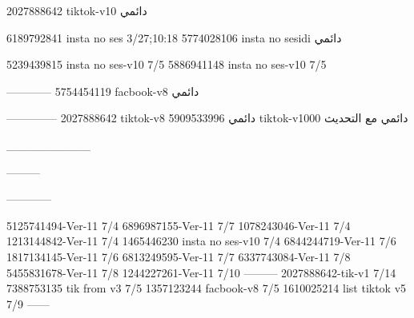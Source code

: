 2027888642 tiktok-v10
دائمي

6189792841 insta no ses
3/27;10:18
5774028106 insta no sesidi
دائمي

5239439815 insta no ses-v10
7/5
5886941148 insta no ses-v10
7/5

------------
5754454119 facbook-v8
دائمي


--------------
2027888642 tiktok-v8
دائمي
5909533996 tiktok-v1000
دائمي مع التحديث

__________

---------

------------

5125741494-Ver-11
7/4
6896987155-Ver-11
7/7
1078243046-Ver-11
7/4
1213144842-Ver-11
7/4
1465446230 insta no ses-v10
7/4
6844244719-Ver-11
7/6
1817134145-Ver-11
7/6
6813249595-Ver-11
7/7
6337743084-Ver-11
7/8
5455831678-Ver-11
7/8
1244227261-Ver-11
7/10
---------
2027888642-tik-v1
7/14
7388753135 tik from v3
7/5
1357123244 facbook-v8
7/5
1610025214 list tiktok v5
7/9
------

